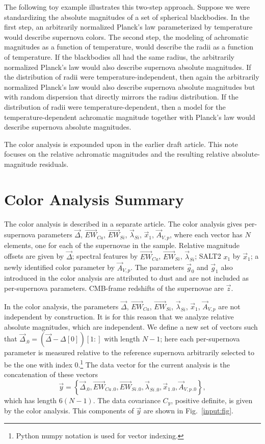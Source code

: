 \documentclass{aastex61}   	%
\begin{document}
The following toy example illustrates this two-step approach.  Suppose we were standardizing the absolute magnitudes of a set of spherical
blackbodies.
In the first step, an arbitrarily normalized Planck's law parameterized by temperature would describe supernova colors.  The second step, the
modeling of achromatic magnitudes as a function of temperature, would describe the radii as a function of temperature.
If the blackbodies all had the same radius, the arbitrarily normalized Planck's law would also describe supernova absolute magnitudes.
If the distribution of radii were temperature-independent, then again the
arbitrarily normalized Planck's law would also describe supernova absolute magnitudes but with random dispersion that directly mirrors the
radius distribution.
If the distribution of radii were temperature-dependent, then a model for the temperature-dependent achromatic magnitude together
with Planck's law would  describe supernova absolute magnitudes.


The color analysis is expounded upon in the earlier draft article.  This note focuses on the relative achromatic magnitudes
and the resulting relative absolute-magnitude residuals.

\section{Color Analysis Summary}
\label{color:sec}
The color analysis is described in a separate article.
The color analysis gives per-supernova parameters
$\vec{\Delta}$,  $\overrightarrow{EW}_{Ca}$,  $\overrightarrow{EW}_{Si}$,  $\vec{\lambda}_{Si}$,   $\vec{x}_1$,  $\vec{A}_{V,p}$,
where each vector has $N$ elements, one for each of the supernovae in the sample.  
Relative magnitude offsets are given by $\vec{\Delta}$; spectral features by $\overrightarrow{EW}_{Ca}$,  $\overrightarrow{EW}_{Si}$,  $\vec{\lambda}_{Si}$;
SALT2 $x_1$ by $\vec{x}_1$; a newly identified color parameter by $\vec{A}_{V,p}$.
The parameters $\vec{g}_0$ and $\vec{g}_1$ also introduced in the color analysis are attributed to dust
and are not included as per-supernova parameters.  CMB-frame redshifts of the supernovae are $\vec{z}$.

In the color analysis, the parameters $\vec{\Delta}$,  $\overrightarrow{EW}_{Ca}$,  $\overrightarrow{EW}_{Si}$,  $\vec{\lambda}_{Si}$,   $\vec{x}_1$,  $\vec{A}_{V,p}$ are not independent by construction.  
It is for this reason that we analyze
relative absolute magnitudes, which are independent.
We define a new set of vectors such that
$\vec{\Delta}_{.0} = (\vec{\Delta} - \Delta[0])[1:]$ with length $N-1$; here each per-supernova parameter is measured relative to the
reference supernova arbitrarily selected to be the one with index 0.\footnote{Python numpy notation is used for vector indexing.}
The data vector for the current analysis is the concatenation of these vectors
\[
\vec{y} = \left\{\vec{\Delta}_{.0} , \overrightarrow{EW}_{Ca\,.0} ,  \overrightarrow{EW}_{Si\,.0},  \vec{\lambda}_{Si\,.0},   \vec{x}_{1\,.0}, \vec{A}_{V,p\,.0}\right\},
\]
which has length $6(N-1)$.  The data covariance $C_{y}$, positive definite,  is given by the color analysis. This 
components of $\vec{y}$ are shown in Fig.~\ref{input:fig}.
\end{document}
